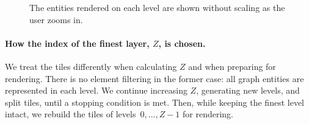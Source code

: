 \documentclass[a4paper,USenglish,anonymous]{gd-lipics-v3}
\begin{document}
\begin{figure}[!tb]
{}
  \caption{The entities rendered on each level are shown without
    scaling as the user zooms in.}
  \label{fig:tile-pyramid-3d}
\end{figure}

\paragraph{How the index of the finest layer, $Z$, is chosen.}
We treat the tiles differently when calculating $Z$ and when preparing
for rendering. There is no element filtering in the former case: all
graph entities are represented in each level. We continue increasing
$Z$, generating new levels, and split tiles, until a stopping
condition is met. Then, while keeping the finest level intact, we
rebuild the tiles of levels~$0, \ldots, Z-1$ for rendering.
\end{document}
